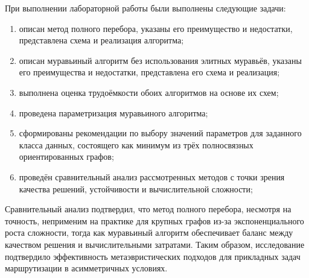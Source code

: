 
При выполнении лабораторной работы были выполнены следующие задачи:
\begin{enumerate}
	\item описан метод полного перебора, указаны его преимущество и недостатки, представлена схема и реализация алгоритма;
	\item описан муравьиный алгоритм без использования элитных муравьёв, указаны его преимущества и недостатки, представлена его схема и реализация;
	\item выполнена оценка трудоёмкости обоих алгоритмов на основе их схем;
	\item проведена параметризация муравьиного алгоритма;
	\item сформированы рекомендации по выбору значений параметров для заданного класса данных, состоящего как минимум из трёх полносвязных ориентированных графов;
	\item проведён сравнительный анализ рассмотренных методов с точки зрения качества решений, устойчивости и вычислительной сложности;
\end{enumerate}


Сравнительный анализ подтвердил, что метод полного перебора, несмотря на точность, неприменим на практике для крупных графов из-за экспоненциального роста сложности,
тогда как муравьиный алгоритм обеспечивает баланс между качеством решения и вычислительными затратами.
Таким образом, исследование подтвердило эффективность метаэвристических подходов для прикладных задач маршрутизации в асимметричных условиях.